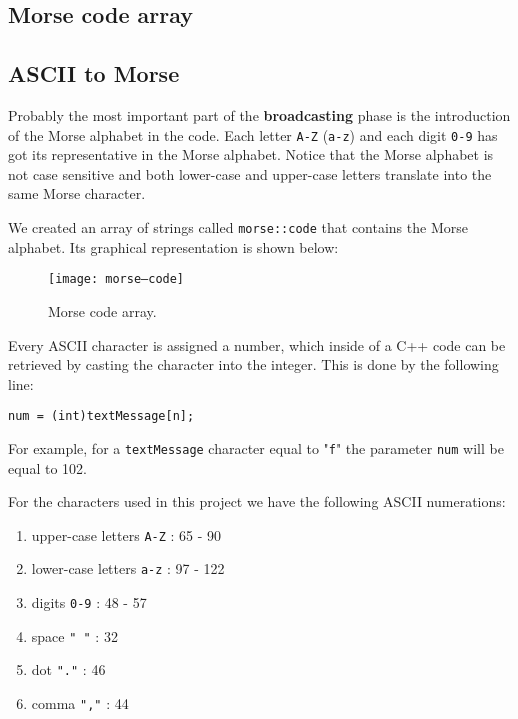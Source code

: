 \documentclass[12pt]{report}
\begin{document}
\subsection{Morse code array}



\subsection{ASCII to Morse} \label{sec:asciitomorse}

Probably the most important part of the \textbf{broadcasting} phase is the introduction of the Morse alphabet in the code. Each letter \verb|A-Z| (\verb|a-z|) and each digit \verb|0-9| has got its representative in the Morse alphabet. Notice that the Morse alphabet is not case sensitive and both lower-case and upper-case letters translate into the same Morse character.

We created an array of strings called \verb|morse::code| that contains the Morse alphabet. Its graphical representation is shown below:

\begin{figure}[H]
\centering\texttt{[image: morse--code]}
\caption{Morse code array.}				
\label{fig:morse_code_array}
\end{figure}

Every ASCII character is assigned a number, which inside of a C++ code can be retrieved by casting the character into the integer. This is done by the following line: 

\begin{snugshade}
\verb|num = (int)textMessage[n];|
\end{snugshade}

For example, for a \verb|textMessage| character equal to "\verb|f|" the parameter \verb|num| will be equal to 102.

For the characters used in this project we have the following ASCII numerations:


\begin{enumerate}

\item upper-case letters \verb|A-Z| : 65 - 90

\item lower-case letters \verb|a-z| : 97 - 122

\item digits \verb|0-9| : 48 - 57

\item space \verb|" "| : 32

\item dot \verb|"."| : 46

\item comma \verb|","| : 44

\end{enumerate}
\end{document}
